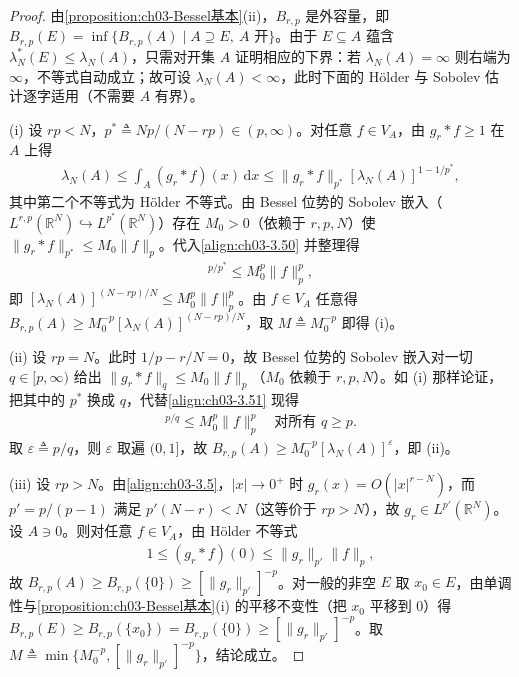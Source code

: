 \documentclass[../../main.tex]{subfiles}%
\begin{document}
\begin{proof}
由\cref{proposition:ch03-Bessel基本}(ii)，$B_{r,p}$ 是外容量，即 $B_{r,p}(E)=\inf\{B_{r,p}(A)\mid A\supseteq E,\ A\text{ 开}\}$。由于 $E\subseteq A$ 蕴含 $\lambda_N^*(E)\leqslant\lambda_N(A)$，只需对开集 $A$ 证明相应的下界：若 $\lambda_N(A)=\infty$ 则右端为 $\infty$，不等式自动成立；故可设 $\lambda_N(A)<\infty$，此时下面的 Hölder 与 Sobolev 估计逐字适用（不需要 $A$ 有界）。

(i) 设 $rp<N$，$p^*\triangleq Np/(N-rp)\in(p,\infty)$。对任意 $f\in V_A$，由 $g_r*f\geqslant1$ 在 $A$ 上得
\begin{align}
\lambda_N(A)\leqslant\int_A(g_r*f)(x)\,\mathrm{d}x
\leqslant\|g_r*f\|_{p^*}[\lambda_N(A)]^{1-1/p^*},\label{align:ch03-3.50}
\end{align}
其中第二个不等式为 Hölder 不等式。由 Bessel 位势的 Sobolev 嵌入（$L^{r,p}(\mathbb{R}^N)\hookrightarrow L^{p^*}(\mathbb{R}^N)$）存在 $M_0>0$（依赖于 $r,p,N$）使 $\|g_r*f\|_{p^*}\leqslant M_0\|f\|_p$。代入\eqref{align:ch03-3.50} 并整理得
\begin{align}
[\lambda_N(A)]^{p/p^*}\leqslant M_0^p\|f\|_p^p,\label{align:ch03-3.51}
\end{align}
即 $[\lambda_N(A)]^{(N-rp)/N}\leqslant M_0^p\|f\|_p^p$。由 $f\in V_A$ 任意得 $B_{r,p}(A)\geqslant M_0^{-p}[\lambda_N(A)]^{(N-rp)/N}$，取 $M\triangleq M_0^{-p}$ 即得 (i)。

(ii) 设 $rp=N$。此时 $1/p-r/N=0$，故 Bessel 位势的 Sobolev 嵌入对一切 $q\in[p,\infty)$ 给出 $\|g_r*f\|_q\leqslant M_0\|f\|_p$（$M_0$ 依赖于 $r,p,N$）。如 (i) 那样论证，把其中的 $p^*$ 换成 $q$，代替\eqref{align:ch03-3.51} 现得
\begin{align*}
[\lambda_N(A)]^{p/q}\leqslant M_0^p\|f\|_p^p
\quad \text{对所有 }q\geqslant p.
\end{align*}
取 $\varepsilon\triangleq p/q$，则 $\varepsilon$ 取遍 $(0,1]$，故 $B_{r,p}(A)\geqslant M_0^{-p}[\lambda_N(A)]^{\varepsilon}$，即 (ii)。

(iii) 设 $rp>N$。由\eqref{align:ch03-3.5}，$|x|\to0^+$ 时 $g_r(x)=O(|x|^{r-N})$，而 $p'=p/(p-1)$ 满足 $p'(N-r)<N$（这等价于 $rp>N$），故 $g_r\in L^{p'}(\mathbb{R}^N)$。设 $A\ni0$。则对任意 $f\in V_A$，由 Hölder 不等式
\begin{align*}
1\leqslant(g_r*f)(0)\leqslant\|g_r\|_{p'}\|f\|_p,
\end{align*}
故 $B_{r,p}(A)\geqslant B_{r,p}(\{0\})\geqslant[\|g_r\|_{p'}]^{-p}$。对一般的非空 $E$ 取 $x_0\in E$，由单调性与\cref{proposition:ch03-Bessel基本}(i) 的平移不变性（把 $x_0$ 平移到 $0$）得 $B_{r,p}(E)\geqslant B_{r,p}(\{x_0\})=B_{r,p}(\{0\})\geqslant[\|g_r\|_{p'}]^{-p}$。取 $M\triangleq\min\{M_0^{-p},[\|g_r\|_{p'}]^{-p}\}$，结论成立。
\end{proof}
\end{document}
